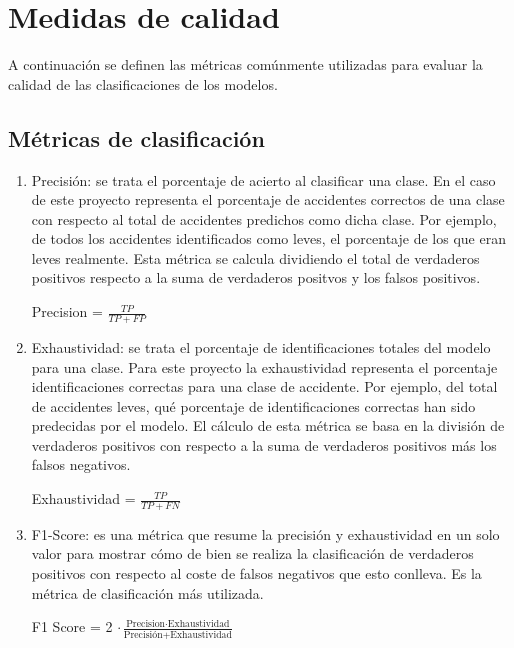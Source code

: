     \section{Medidas de calidad}

        A continuación se definen las métricas comúnmente utilizadas para evaluar la calidad de las clasificaciones de los modelos.


        \subsection{Métricas de clasificación}

        \begin{enumerate}

            \item Precisión: se trata el porcentaje de acierto al clasificar una clase. En el caso de este proyecto representa el porcentaje de accidentes correctos de una clase con respecto al total de accidentes predichos como dicha clase. Por ejemplo, de todos los accidentes identificados como leves, el porcentaje de los que eran leves realmente. Esta métrica se calcula dividiendo el total de verdaderos positivos respecto a la suma de verdaderos positvos y los falsos positivos.

                \begin{center}
                    Precision = $\frac{TP}{TP + FP}$
                \end{center}

            \item Exhaustividad: se trata el porcentaje de identificaciones totales del modelo para una clase. Para este proyecto la exhaustividad representa el porcentaje identificaciones correctas para una clase de accidente. Por ejemplo, del total de accidentes leves, qué porcentaje de identificaciones correctas han sido predecidas por el modelo. El cálculo de esta métrica se basa en la división de verdaderos positivos con respecto a la suma de verdaderos positivos más los falsos negativos.

                \begin{center}
                    Exhaustividad = $\frac{TP}{TP + FN}$
                \end{center}

            \item F1-Score: es una métrica que resume la precisión y exhaustividad en un solo valor para mostrar cómo de bien se realiza la clasificación de verdaderos positivos con respecto al coste de falsos negativos que esto conlleva. Es la métrica de clasificación más utilizada.

                \begin{center}
                    F1 Score = 2 $\cdot \frac{\text{Precision} \cdot \text{Exhaustividad}} {\text{Precisión} + \text{Exhaustividad}}$
                \end{center}

        \end{enumerate}

